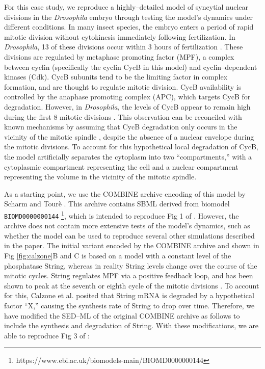 \documentclass[10pt,letterpaper]{article}
\begin{document}
For this case study, we reproduce a highly--detailed model of syncytial nuclear divisions in the \textit{Drosophila} embryo \cite{calzone2007dynamical} through testing the model's dynamics under different conditions.
In many insect species, the embryo enters a period of rapid mitotic division without cytokinesis \cite{gilbertDevBiol} immediately following fertilization. In \textit{Drosophila}, 13 of these divisions occur within 3 hours of fertilization \cite{calzone2007dynamical}. These divisions are regulated by metaphase promoting factor (MPF), a complex between cyclin (specifically the cyclin CycB in this model) and cyclin--dependent kinases (Cdk). CycB subunits tend to be the limiting factor in complex formation, and are thought to regulate mitotic division. CycB availability is controlled by the anaphase promoting complex (APC), which targets CycB for degradation. However, in \textit{Drosophila}, the levels of CycB appear to remain high during the first 8 mitotic divisions \cite{edgar1994distinct}. This observation can be reconciled with known mechanisms by assuming that CycB degradation only occurs in the vicinity of the mitotic spindle \cite{calzone2007dynamical,huang2002dynamic,raff2002roles}, despite the absence of a nuclear envelope during the mitotic divisions. To account for this hypothetical local degradation of CycB, the model artificially separates the cytoplasm into two ``compartments,'' with a cytoplasmic compartment representing the cell and a nuclear compartment representing the volume in the vicinity of the mitotic spindle.%

As a starting point, we use the COMBINE archive encoding of this model by Scharm and Tour\`{e} \cite{scharmShowcase}. This archive contains SBML derived from biomodel \texttt{BIOMD0000000144} \footnote{https://www.ebi.ac.uk/biomodels-main/BIOMD0000000144}, which is intended to reproduce Fig 1 of \cite{calzone2007dynamical}. However, the archive does not contain more extensive tests of the model's dynamics, such as whether the model can be used to reproduce several other simulations described  in the paper. The initial variant encoded by the COMBINE archive and shown in Fig \ref{fig:calzone}B and C is based on a model with a constant level of the phosphatase String, whereas in reality String levels change over the course of the mitotic cycles. String regulates MPF via a positive feedback loop, and has been shown to peak at the seventh or eighth cycle of the mitotic divisions \cite{calzone2007dynamical}. To account for this, Calzone et al. \cite{calzone2007dynamical} posited that String mRNA is degraded by a hypothetical factor ``X,'' causing the synthesis rate of String to drop over time.
Therefore, we have modified the SED--ML of the original COMBINE archive \cite{scharmShowcase} as follows to include the synthesis and degradation of String. With these modifications, we are able to reproduce Fig 3 of \cite{calzone2007dynamical}:
\end{document}
